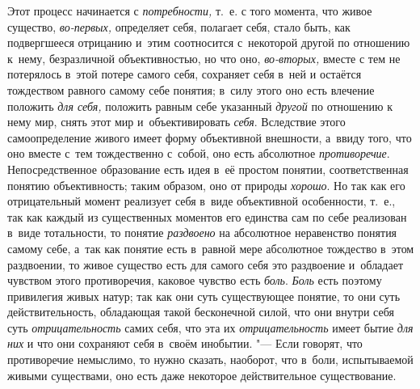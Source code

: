 Этот процесс начинается с
{\em потребности,} т.~е.
с того момента, что живое существо,
{\em во-первых,}
определяет себя, полагает себя, стало быть, как подвергшееся
отрицанию и~этим соотносится с~некоторой другой по отношению к~нему,
безразличной объективностью, но что оно,
{\em во-вторых,} вместе с
тем не потерялось в~этой потере самого себя, сохраняет себя в~ней и
остаётся тождеством равного самому себе понятия; в~силу этого оно есть
влечение положить {\em для себя,}
положить равным себе указанный
{\em другой} по отношению
к нему мир, снять этот мир и~объективировать
{\em себя}. Вследствие
этого самоопределение живого имеет форму объективной внешности, а~ввиду
того, что оно вместе с~тем тождественно с~собой, оно есть абсолютное
{\em противоречие}.
Непосредственное образование есть идея в~её простом понятии,
соответственная понятию объективность; таким образом, оно от природы
{\em хорошо}. Но так как
его отрицательный момент реализует себя в~виде объективной особенности,
т.~е., так как каждый из существенных моментов его единства сам по себе
реализован в~виде тотальности, то понятие
{\em раздвоено} на
абсолютное неравенство понятия самому себе, а~так как понятие есть в~равной
мере абсолютное тождество в~этом раздвоении, то живое существо есть для
самого себя это раздвоение и~обладает чувством этого противоречия, каковое
чувство есть {\em боль}.
{\em Боль} есть поэтому
привилегия живых натур; так как они суть существующее понятие, то они суть
действительность, обладающая такой бесконечной силой, что они внутри себя
суть {\em отрицательность}
самих себя, что эта их
{\em отрицательность}
имеет бытие {\em для них}
и что они сохраняют себя в~своём инобытии. "---
Если говорят, что противоречие немыслимо, то нужно сказать,
наоборот, что в~боли, испытываемой живыми существами, оно есть даже
некоторое действительное существование.


